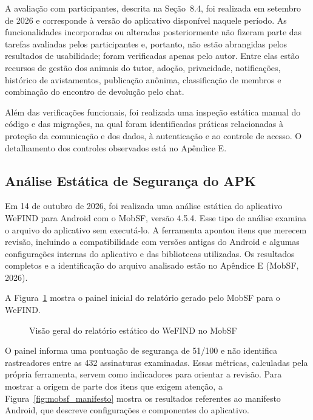A avaliação com participantes, descrita na Seção~8.4, foi realizada em setembro de 2026 e corresponde à versão do aplicativo disponível naquele período. As funcionalidades incorporadas ou alteradas posteriormente não fizeram parte das tarefas avaliadas pelos participantes e, portanto, não estão abrangidas pelos resultados de usabilidade; foram verificadas apenas pelo autor. Entre elas estão recursos de gestão dos animais do tutor, adoção, privacidade, notificações, histórico de avistamentos, publicação anônima, classificação de membros e combinação do encontro de devolução pelo chat.

Além das verificações funcionais, foi realizada uma inspeção estática manual do código e das migrações, na qual foram identificadas práticas relacionadas à proteção da comunicação e dos dados, à autenticação e ao controle de acesso. O detalhamento dos controles observados está no Apêndice E.

\subsection{Análise Estática de Segurança do APK}

Em 14 de outubro de 2026, foi realizada uma análise estática do aplicativo WeFIND para Android com o MobSF, versão 4.5.4. Esse tipo de análise examina o arquivo do aplicativo sem executá-lo. A ferramenta apontou itens que merecem revisão, incluindo a compatibilidade com versões antigas do Android e algumas configurações internas do aplicativo e das bibliotecas utilizadas. Os resultados completos e a identificação do arquivo analisado estão no Apêndice E (MobSF, 2026).

A Figura~\ref{fig:mobsf_visao_geral} mostra o painel inicial do relatório gerado pelo MobSF para o WeFIND.

\begin{figure}[H]
    \centering
    \caption{Visão geral do relatório estático do WeFIND no MobSF}
    \label{fig:mobsf_visao_geral}
\end{figure}

O painel informa uma pontuação de segurança de 51/100 e não identifica rastreadores entre as 432 assinaturas examinadas. Essas métricas, calculadas pela própria ferramenta, servem como indicadores para orientar a revisão. Para mostrar a origem de parte dos itens que exigem atenção, a Figura~\ref{fig:mobsf_manifesto} mostra os resultados referentes ao manifesto Android, que descreve configurações e componentes do aplicativo.

